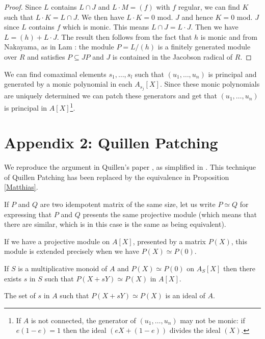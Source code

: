 \begin{proof}
  Since $L$ contains $L\cap J$ and $L\cdot M = (f)$ with $f$ regular, we can find $K$
  such that $L\cdot K = L\cap J$.
  We then have $L\cdot K = 0$ mod. $J$ and hence $K = 0$ mod. $J$ since $L$ contains $f$
  which is monic.
  This means $L\cap J = L\cdot J$. Then we have $L = (h) + L\cdot J$.
  The result then follows from the fact that $h$ is monic and from Nakayama, as in Lam \cite{Lam}:
  the module $P = L/(h)$ is a finitely generated module over $R$ and satisfies
  $P\subseteq JP$ and $J$ is contained in the Jacobson radical of $R$.
\end{proof}

\begin{corollary}
  We can find comaximal elements $s_1,\dots,s_l$ such that $(u_1,\dots,u_n)$ is principal and generated by a
  monic polynomial in each $A_{s_j}[X]$. Since these monic polynomials are uniquely determined
  we can patch these generators and get that $(u_1,\dots,u_n)$ is principal in $A[X]$\footnote{If $A$ is not
  connected, the generator of $(u_1,\dots,u_n)$ may not be monic: if $e(1-e)=1$ then the ideal $(eX+(1-e))$
  divides the ideal $(X)$.}.
\end{corollary}


\section*{Appendix 2: Quillen Patching}

We reproduce the argument in Quillen's paper \cite{Quillen}, as simplified in \cite{lombardi-quitte}.
This technique of Quillen Patching has been replaced by the equivalence in Proposition \ref{Matthias}.

If $P$ and $Q$ are two idempotent matrix of the same size, let us write $P\simeq Q$ for expressing that $P$ and $Q$ presents
the same projective module (which means that there are similar, which is in this case is the same as being equivalent).

If we have a projective module on $A[X]$, presented by a matrix $P(X)$, this module is extended
precisely when we have $P(X)\simeq P(0)$.

\begin{lemma}
  If $S$ is a multiplicative monoid of $A$ and $P(X)\simeq P(0)$ on $A_S[X]$ then there exists
  $s$ in $S$ such that $P(X+sY)\simeq P(X)$ in $A[X]$.
\end{lemma}

\begin{lemma}
  The set of $s$ in $A$ such that $P(X+sY)\simeq P(X)$ is an ideal of $A$.
\end{lemma}

